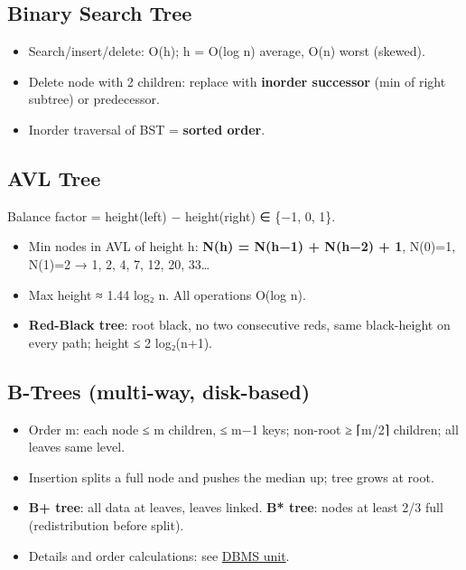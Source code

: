 \needspace{95pt}

\hypertarget{p2-07--33-binary-search-tree}{%
\subsection{Binary Search Tree}\label{p2-07--33-binary-search-tree}}

\begin{itemize}
\tightlist
\item
  Search/insert/delete: O(h); h = O(log n) average, O(n) worst (skewed).
\item
  Delete node with 2 children: replace with \textbf{inorder successor} (min of right subtree) or predecessor.
\item
  Inorder traversal of BST = \textbf{sorted order}.
\end{itemize}

\needspace{125pt}

\hypertarget{p2-07--34-avl-tree}{%
\subsection{AVL Tree}\label{p2-07--34-avl-tree}}

Balance factor = height(left) − height(right) ∈ \{−1, 0, 1\}.



\begin{itemize}
\tightlist
\item
  Min nodes in AVL of height h: \textbf{N(h) = N(h−1) + N(h−2) + 1}, N(0)=1, N(1)=2 → 1, 2, 4, 7, 12, 20, 33\ldots{}
\item
  Max height ≈ 1.44 log₂ n. All operations O(log n).
\item
  \textbf{Red-Black tree}: root black, no two consecutive reds, same black-height on every path; height ≤ 2 log₂(n+1).
\end{itemize}

\needspace{95pt}

\hypertarget{p2-07--35-b-trees-multi-way-disk-based}{%
\subsection{B-Trees (multi-way, disk-based)}\label{p2-07--35-b-trees-multi-way-disk-based}}

\begin{itemize}
\tightlist
\item
  Order m: each node ≤ m children, ≤ m−1 keys; non-root ≥ ⌈m/2⌉ children; all leaves same level.
\item
  Insertion splits a full node and pushes the median up; tree grows at root.
\item
  \textbf{B+ tree}: all data at leaves, leaves linked. \textbf{B* tree}: nodes at least 2/3 full (redistribution before split).
\item
  Details and order calculations: see \protect\hyperlink{p2-04--8-file-organisation--indexing}{DBMS unit}.
\end{itemize}

